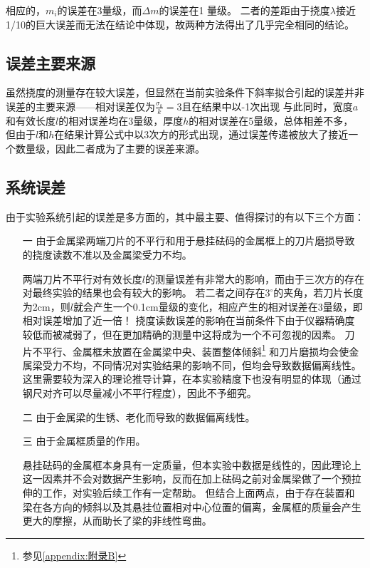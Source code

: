 \documentclass[12pt, a4paper]{ctexart}
\begin{document}
相应的，$m_i$的误差在3\textpertenthousand 量级，而$\Delta m$的误差在1 \textperthousand 量级。
二者的差距由于挠度$\lambda$接近1/10的巨大误差而无法在结论中体现，故两种方法得出了几乎完全相同的结论。

\subsection{误差主要来源}
虽然挠度的测量存在较大误差，但显然在当前实验条件下斜率拟合引起的误差并非误差的主要来源——相对误差仅为$\frac{\sigma_k}k = $3\textpertenthousand 且在结果中以-1次出现
与此同时，宽度$a$和有效长度$l$的相对误差均在3\textperthousand 量级，厚度$h$的相对误差在5\textperthousand 量级，总体相差不多，
但由于$l$和$h$在结果计算公式中以3次方的形式出现，通过误差传递被放大了接近一个数量级，因此二者成为了主要的误差来源。

\subsection{系统误差}
由于实验系统引起的误差是多方面的，其中最主要、值得探讨的有以下三个方面：
\begin{enumerate}
    \item[一] 由于金属梁两端刀片的不平行和用于悬挂砝码的金属框上的刀片磨损导致的挠度读数不准以及金属梁受力不均。
    
    两端刀片不平行对有效长度$l$的测量误差有非常大的影响，而由于三次方的存在对最终实验的结果也会有较大的影响。
    若二者之间存在$3^{\circ}$的夹角，若刀片长度为2cm，则$l$就会产生一个0.1cm量级的变化，相应产生的相对误差在3\textperthousand 量级，即相对误差增加了近一倍！
    挠度读数误差的影响在当前条件下由于仪器精确度较低而被减弱了，但在更加精确的测量中这将成为一个不可忽视的因素。
    刀片不平行、金属框未放置在金属梁中央、装置整体倾斜\footnote{参见\ref{appendix:附录B}} 和刀片磨损均会使金属梁受力不均，不同情况对实验结果的影响不同，但均会导致数据偏离线性。
    这里需要较为深入的理论推导计算，在本实验精度下也没有明显的体现（通过钢尺对齐可以尽量减小不平行程度），因此不予细究。
    \item[二] 由于金属梁的生锈、老化而导致的数据偏离线性。
    \item[三] 由于金属框质量的作用。
    
    悬挂砝码的金属框本身具有一定质量，但本实验中数据是线性的，因此理论上这一因素并不会对数据产生影响，反而在加上砝码之前对金属梁做了一个预拉伸的工作，对实验后续工作有一定帮助。
    但结合上面两点，由于存在装置和梁在各方向的倾斜以及其悬挂位置相对中心位置的偏离，金属框的质量会产生更大的摩擦，从而助长了梁的非线性弯曲。
\end{enumerate}
\end{document}
